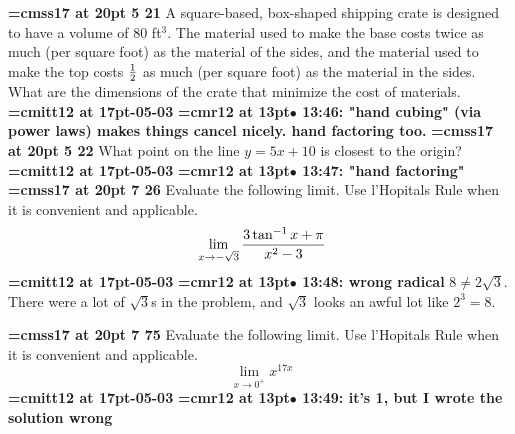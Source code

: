 {\medskip\noindent\bf\font\titlefont=cmss17 at 20pt 5 21}\medskip
A square-based, box-shaped shipping crate is designed to
have a volume of 80 ft$^3$. The material used to make the base
costs twice as much (per square foot) as the material of the sides,
and the material used to make the top costs ${1 \over 2}$ as
much (per square foot) as the material in the sides. What
are the dimensions of the crate that minimize the cost of
materials.
{\medskip\noindent\bf\font\titlefont=cmitt12 at 17pt-05-03}\medskip
{\smallskip\noindent\bf\font\titlefont=cmr12 at 13pt\titlefont $\bullet$ 13:46: "hand cubing" (via power laws) makes things cancel nicely. hand factoring too.}\smallskip
{}
{\medskip\noindent\bf\font\titlefont=cmss17 at 20pt 5 22}\medskip
What point on the line $y = 5x + 10$ is closest to the origin?
{\medskip\noindent\bf\font\titlefont=cmitt12 at 17pt-05-03}\medskip
{\smallskip\noindent\bf\font\titlefont=cmr12 at 13pt\titlefont $\bullet$ 13:47: "hand factoring"}\smallskip
{}
{\medskip\noindent\bf\font\titlefont=cmss17 at 20pt 7 26}\medskip
Evaluate the following limit. Use l'Hopitals Rule when it is convenient
and applicable.
$$\
\lim_{x \to -\sqrt{3}}
{
3\tan^{-1}x + \pi
\over
x^2 - 3
}
$$
{\medskip\noindent\bf\font\titlefont=cmitt12 at 17pt-05-03}\medskip
{\smallskip\noindent\bf\font\titlefont=cmr12 at 13pt\titlefont $\bullet$ 13:48: wrong radical}\smallskip
$8 \ne 2\sqrt{3}$. There were a lot of $\sqrt{3}$s in the problem, and $\sqrt{3}$ looks an awful lot like $2^3 = 8$.
\par

{\medskip\noindent\bf\font\titlefont=cmss17 at 20pt 7 75}\medskip
Evaluate the following limit. Use l'Hopitals Rule when it is convenient
and applicable.
$$\
\lim_{x \to 0^+}
{
x^{17x}
}
$$
{\medskip\noindent\bf\font\titlefont=cmitt12 at 17pt-05-03}\medskip
{\smallskip\noindent\bf\font\titlefont=cmr12 at 13pt\titlefont $\bullet$ 13:49: it's 1, but I wrote the solution wrong}\smallskip
\bye
